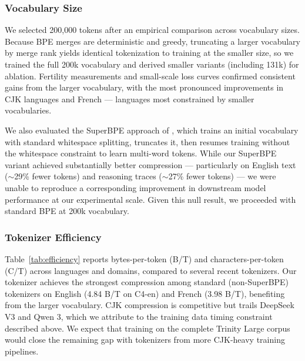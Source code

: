 \documentclass{article}
\begin{document}
\subsubsection{Vocabulary Size}

We selected 200,000 tokens after an empirical comparison across vocabulary sizes. Because BPE merges are deterministic and greedy, truncating a larger vocabulary by merge rank yields identical tokenization to training at the smaller size, so we trained the full 200k vocabulary and derived smaller variants (including 131k) for ablation. Fertility measurements and small-scale loss curves confirmed consistent gains from the larger vocabulary, with the most pronounced improvements in CJK languages and French --- languages most constrained by smaller vocabularies.

We also evaluated the SuperBPE approach of \citet{liu2025superbpespacetravellanguage}, which trains an initial vocabulary with standard whitespace splitting, truncates it, then resumes training without the whitespace constraint to learn multi-word tokens. While our SuperBPE variant achieved substantially better compression --- particularly on English text ($\sim$29\% fewer tokens) and reasoning traces ($\sim$27\% fewer tokens) --- we were unable to reproduce a corresponding improvement in downstream model performance at our experimental scale. Given this null result, we proceeded with standard BPE at 200k vocabulary.

\subsubsection{Tokenizer Efficiency}

Table~\ref{tab:efficiency} reports bytes-per-token (B/T) and characters-per-token (C/T) across languages and domains, compared to several recent tokenizers. Our tokenizer achieves the strongest compression among standard (non-SuperBPE) tokenizers on English (4.84 B/T on C4-en) and French (3.98 B/T), benefiting from the larger vocabulary. CJK compression is competitive but trails DeepSeek V3 and Qwen 3, which we attribute to the training data timing constraint described above. We expect that training on the complete Trinity Large corpus would close the remaining gap with tokenizers from more CJK-heavy training pipelines.
\end{document}
